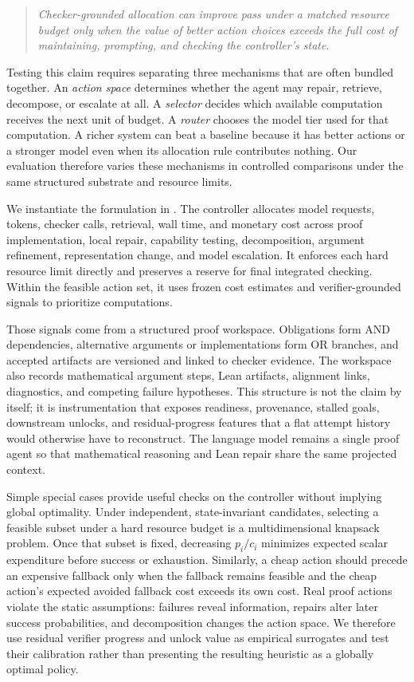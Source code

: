 \begin{quote}
\emph{Checker-grounded allocation can improve pass under a matched resource
budget only when the value of better action choices exceeds the full cost of
maintaining, prompting, and checking the controller's state.}
\end{quote}

Testing this claim requires separating three mechanisms that are often bundled
together. An \emph{action space} determines whether the agent may repair,
retrieve, decompose, or escalate at all. A \emph{selector} decides which
available computation receives the next unit of budget. A \emph{router}
chooses the model tier used for that computation. A richer system can beat a
baseline because it has better actions or a stronger model even when its
allocation rule contributes nothing. Our evaluation therefore varies these
mechanisms in controlled comparisons under the same structured substrate and
resource limits.

We instantiate the formulation in \system. The controller allocates model
requests, tokens, checker calls, retrieval, wall time, and monetary cost across
proof implementation, local repair, capability testing, decomposition,
argument refinement, representation change, and model escalation. It enforces
each hard resource limit directly and preserves a reserve for final integrated
checking. Within the feasible action set, it uses frozen cost estimates and
verifier-grounded signals to prioritize computations.

Those signals come from a structured proof workspace. Obligations form AND
dependencies, alternative arguments or implementations form OR branches, and
accepted artifacts are versioned and linked to checker evidence. The workspace
also records mathematical argument steps, Lean artifacts, alignment links,
diagnostics, and competing failure hypotheses. This structure is not the claim
by itself; it is instrumentation that exposes readiness, provenance, stalled
goals, downstream unlocks, and residual-progress features that a flat attempt
history would otherwise have to reconstruct. The language model remains a
single proof agent so that mathematical reasoning and Lean repair share the
same projected context.

Simple special cases provide useful checks on the controller without implying
global optimality. Under independent, state-invariant candidates, selecting a
feasible subset under a hard resource budget is a multidimensional knapsack
problem. Once that subset is fixed, decreasing \(p_i/c_i\) minimizes expected
scalar expenditure before success or exhaustion. Similarly, a cheap action
should precede an expensive fallback only when the fallback remains feasible
and the cheap action's expected avoided fallback cost exceeds its own cost.
Real proof actions violate the static assumptions: failures reveal information,
repairs alter later success probabilities, and decomposition changes the action
space. We therefore use residual verifier progress and unlock value as
empirical surrogates and test their calibration rather than presenting the
resulting heuristic as a globally optimal policy.

